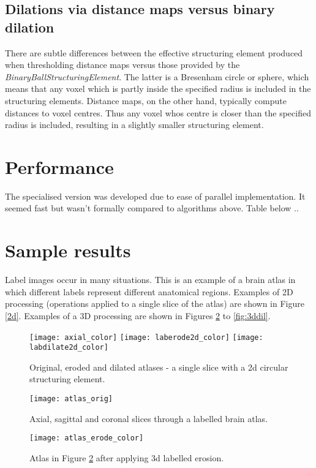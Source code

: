 \documentclass{InsightArticle}
\begin{document}
\subsection{Dilations via distance maps versus binary dilation}
There are subtle differences between the effective structuring element
produced when thresholding distance maps versus those provided by the
{\em BinaryBallStructuringElement}. The latter is a Bresenham circle
or sphere, which means that any voxel which is partly inside the
specified radius is included in the structuring elements. Distance
maps, on the other hand, typically compute distances to voxel
centres. Thus any voxel whos centre is closer than the specified
radius is included, resulting in a slightly smaller structuring
element.
\section{Performance}
The specialised version was developed due to ease of parallel
implementation. It seemed fast but wasn't formally compared to
algorithms above. Table below ..


\section{Sample results}
Label images occur in many situations. This is an example of a brain
atlas in which different labels represent different anatomical
regions. Examples of 2D processing (operations applied to a single
slice of the atlas) are shown in Figure \ref{2d}. Examples of a 3D
processing are shown in Figures \ref{fig:3dorig} to \ref{fig:3ddil}.

\begin{figure}[htbp]
\centering
\texttt{[image: axial\_color]}
\texttt{[image: laberode2d\_color]}
\texttt{[image: labdilate2d\_color]}
\caption{Original, eroded and dilated atlases - a single slice with a 2d circular structuring element.\label{fig:2d}}
\end{figure}

\begin{figure}[htbp]
\centering
\texttt{[image: atlas\_orig]}
\caption{Axial, sagittal and coronal slices through a labelled brain atlas.\label{fig:3dorig}}
\end{figure}

\begin{figure}[htbp]
\centering
\texttt{[image: atlas\_erode\_color]}
\caption{Atlas in Figure \ref{fig:3dorig} after applying 3d labelled erosion. \label{fig:3dero}}
\end{figure}
\end{document}
